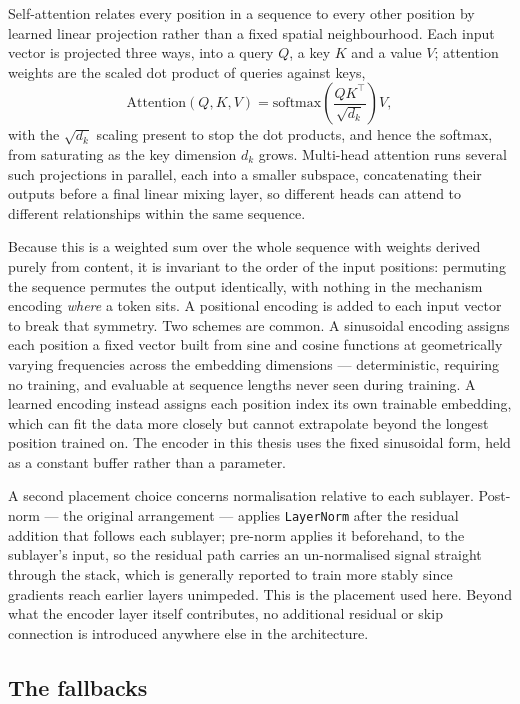 Self-attention relates every position in a sequence to every other position by learned linear projection rather than a fixed spatial neighbourhood. Each input vector is projected three ways, into a query $Q$, a key $K$ and a value $V$; attention weights are the scaled dot product of queries against keys,
\[
	\text{Attention}(Q,K,V) = \text{softmax}\!\left(\frac{QK^\top}{\sqrt{d_k}}\right)V,
\]
with the $\sqrt{d_k}$ scaling present to stop the dot products, and hence the softmax, from saturating as the key dimension $d_k$ grows. Multi-head attention runs several such projections in parallel, each into a smaller subspace, concatenating their outputs before a final linear mixing layer, so different heads can attend to different relationships within the same sequence.

Because this is a weighted sum over the whole sequence with weights derived purely from content, it is invariant to the order of the input positions: permuting the sequence permutes the output identically, with nothing in the mechanism encoding \textit{where} a token sits. A positional encoding is added to each input vector to break that symmetry. Two schemes are common. A sinusoidal encoding assigns each position a fixed vector built from sine and cosine functions at geometrically varying frequencies across the embedding dimensions --- deterministic, requiring no training, and evaluable at sequence lengths never seen during training. A learned encoding instead assigns each position index its own trainable embedding, which can fit the data more closely but cannot extrapolate beyond the longest position trained on. The encoder in this thesis uses the fixed sinusoidal form, held as a constant buffer rather than a parameter.

A second placement choice concerns normalisation relative to each sublayer. Post-norm --- the original arrangement --- applies \texttt{LayerNorm} after the residual addition that follows each sublayer; pre-norm applies it beforehand, to the sublayer's input, so the residual path carries an un-normalised signal straight through the stack, which is generally reported to train more stably since gradients reach earlier layers unimpeded. This is the placement used here. Beyond what the encoder layer itself contributes, no additional residual or skip connection is introduced anywhere else in the architecture.

\subsection{The fallbacks}
\label{sec:fallbacks}

